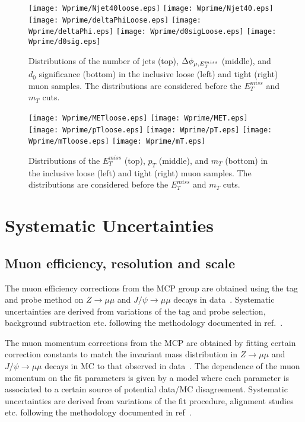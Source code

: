 \begin{figure}[]
  \centering
  \texttt{[image: Wprime/Njet40loose.eps]}
  \texttt{[image: Wprime/Njet40.eps]}
  \texttt{[image: Wprime/deltaPhiLoose.eps]}
  \texttt{[image: Wprime/deltaPhi.eps]}
  \texttt{[image: Wprime/d0sigLoose.eps]}
  \texttt{[image: Wprime/d0sig.eps]}
  \caption{
  Distributions of the number of jets (top), $\Delta\phi_{\mu,E_T^{miss}}$ (middle), 
  and $d_0$ significance (bottom) in the inclusive loose (left) and tight (right) muon samples. 
  The distributions are considered before the $E_T^{miss}$ and $m_T$ cuts.
}
  \label{fig:muMMval1}
\end{figure}
\begin{figure}[]
  \centering
  \texttt{[image: Wprime/METloose.eps]}
  \texttt{[image: Wprime/MET.eps]}
  \texttt{[image: Wprime/pTloose.eps]}
  \texttt{[image: Wprime/pT.eps]}
  \texttt{[image: Wprime/mTloose.eps]}
  \texttt{[image: Wprime/mT.eps]}
  \caption{
  Distributions of the $E_T^{miss}$ (top), $p_T$ (middle), and $m_T$ (bottom)
  in the inclusive loose (left) and tight (right) muon samples. 
  The distributions are considered before the $E_T^{miss}$ and $m_T$ cuts.
}
  \label{fig:muMMval2}
\end{figure}


\section{Systematic Uncertainties}
\label{sec:wprimeSystematics}
\subsection{Muon efficiency, resolution and scale}
The muon efficiency corrections from the MCP group are obtained using the tag and probe method
on $Z\to\mu\mu$ and $J/\psi\to\mu\mu$ decays in data~\cite{MCP13TeV}. Systematic uncertainties
are derived from variations of the tag and probe selection, background subtraction etc. following
the methodology documented in ref.~\cite{MCPrun1}.

The muon momentum corrections from the MCP are obtained by fitting certain correction constants 
to match the invariant mass distribution in $Z\to\mu\mu$ and $J/\psi\to\mu\mu$ decays in MC
to that observed in data~\cite{MCP13TeV}. The dependence of the muon momentum on the fit parameters
is given by a model where each parameter is associated to a certain source of potential data/MC disagreement.
Systematic uncertainties are derived from variations of the fit procedure, alignment studies etc. 
following the methodology documented in ref~\cite{MCPrun1}.

